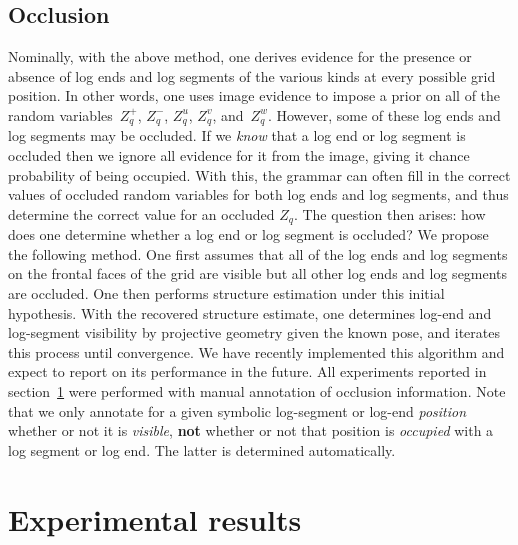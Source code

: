 \subsection{Occlusion}
\label{sec:occlusion}

Nominally, with the above method, one derives evidence for the presence or
absence of log ends and log segments of the various kinds at every possible
grid position.
%
In other words, one uses image evidence to impose a prior on all of the random
variables~$Z^+_q$, $Z^-_q$, $Z^u_q$, $Z^v_q$, and~$Z^w_q$.
%
However, some of these log ends and log segments may be occluded.
%
If we \emph{know} that a log end or log segment is occluded then we ignore all
evidence for it from the image, giving it chance probability of being occupied.
%
With this, the grammar can often fill in the correct values of occluded random
variables for both log ends and log segments, and thus determine the correct
value for an occluded $Z_q$.
%
The question then arises: how does one determine whether a log end or log
segment is occluded?
%
We propose the following method.
%
One first assumes that all of the log ends and log segments on the frontal
faces of the grid are visible but all other log ends and log segments are
occluded.
%
One then performs structure estimation under this initial hypothesis.
%
With the recovered structure estimate, one determines log-end and log-segment
visibility by projective geometry given the known pose, and iterates this
process until convergence.
%
We have recently implemented this algorithm and expect to report on its
performance in the future.
%
All experiments reported in section~\ref{sec:results} were performed with
manual annotation of occlusion information.
%
Note that we only annotate for a given symbolic log-segment or log-end
\emph{position} whether or not it is \emph{visible}, \textbf{not} whether or
not that position is \emph{occupied} with a log segment or log end.
%
The latter is determined automatically.

\section{Experimental results}
\label{sec:results}
\addtolength{\textheight}{-0.32cm}

